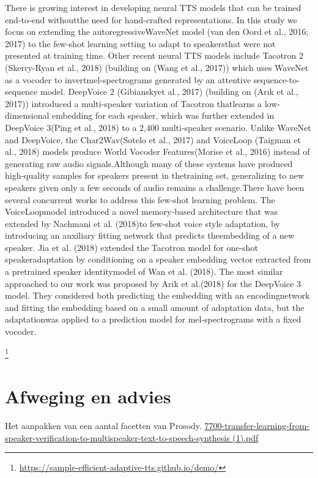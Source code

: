 There is growing interest in developing neural TTS models that can be trained end-to-end withoutthe need for hand-crafted representations.  In this study we focus on extending the autoregressiveWaveNet model (van den Oord et al., 2016; 2017) to the few-shot learning setting to adapt to speakersthat were not presented at training time. Other recent neural TTS models include Tacotron 2 (Skerry-Ryan et al., 2018) (building on (Wang et al., 2017)) which uses WaveNet as a vocoder to invertmel-spectrograms generated by an attentive sequence-to-sequence model. DeepVoice 2 (Gibianskyet al., 2017) (building on (Arık et al., 2017)) introduced a multi-speaker variation of Tacotron thatlearns a low-dimensional embedding for each speaker, which was further extended in DeepVoice 3(Ping et al., 2018) to a 2,400 multi-speaker scenario. Unlike WaveNet and DeepVoice, the Char2Wav(Sotelo et al., 2017) and VoiceLoop (Taigman et al., 2018) models produce World Vocoder Features(Morise et al., 2016) instead of generating raw audio signals.Although many of these systems have produced high-quality samples for speakers present in thetraining set, generalizing to new speakers given only a few seconds of audio remains a challenge.There have been several concurrent works to address this few-shot learning problem. The VoiceLoopmodel introduced a novel memory-based architecture that was extended by Nachmani et al. (2018)to few-shot voice style adaptation,  by introducing an auxiliary fitting network that predicts theembedding of a new speaker.  Jia et al. (2018) extended the Tacotron model for one-shot speakeradaptation by conditioning on a speaker embedding vector extracted from a pretrained speaker identitymodel of Wan et al. (2018). The most similar approached to our work was proposed by Arik et al.(2018) for the DeepVoice 3 model. They considered both predicting the embedding with an encodingnetwork and fitting the embedding based on a small amount of adaptation data, but the adaptationwas applied to a prediction model for mel-spectrograms with a fixed vocoder.

\cite{chen2018sample}
\footnote{\url{https://sample-efficient-adaptive-tts.github.io/demo/}}

\section{Afweging en advies}

Het aanpakken van een aantal facetten van Prosody.
\url{7700-transfer-learning-from-speaker-verification-to-multispeaker-text-to-speech-synthesis (1).pdf}